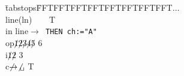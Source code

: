 \documentclass[a5paper]{article}
\begin{document}
\begin{tabbing}
\ttfamily
\quad\=tabstops\quad\=FFTFFTFFTFFTFFTFFTFFTFFT$\ldots$\\
\>line(ln)\>\verb*|    |T\\
\>in line\>$\rightarrow$\verb*| THEN ch:="A"|\\
\>op\>$\not1\not2\not3\not4\not5$ 6\\
\>i\>$\not1\not2$ 3\\
\>c\>$\not\rightarrow\not\hbox{\verb*| |}$ T
\end{tabbing}
\end{document}
